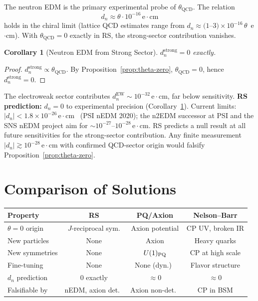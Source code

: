 \documentclass[12pt,a4paper]{article}
\newtheorem{corollary}[theorem]{Corollary}
\theoremstyle{definition}
\theoremstyle{remark}
\begin{document}
The neutron EDM is the primary experimental probe of $\theta_{\mathrm{QCD}}$.
The relation
\begin{equation}
d_n \approx \theta \cdot 10^{-16}\,\mathrm{e}\cdot\mathrm{cm}
\end{equation}
holds in the chiral limit (lattice QCD estimates range from $d_n
\approx (1$--$3) \times 10^{-16}\,\theta$~e$\cdot$cm).
With $\theta_{\mathrm{QCD}} = 0$ exactly in RS, the strong-sector
contribution vanishes.

\begin{corollary}[Neutron EDM from Strong Sector]
\label{cor:nedm}
$d_n^{\mathrm{strong}} = 0$ exactly.
\end{corollary}

\begin{proof}
$d_n^{\mathrm{strong}} \propto \theta_{\mathrm{QCD}}$.  By
Proposition~\ref{prop:theta-zero}, $\theta_{\mathrm{QCD}} = 0$, hence
$d_n^{\mathrm{strong}} = 0$.
\end{proof}

The electroweak sector contributes $d_n^{\mathrm{EW}} \sim
10^{-32}\,\mathrm{e}\cdot\mathrm{cm}$, far below sensitivity.
\textbf{RS prediction:} $d_n = 0$ to experimental precision (Corollary~\ref{cor:nedm}).  Current limits: $|d_n| < 1.8 \times
10^{-26}\,\mathrm{e}\cdot\mathrm{cm}$~\cite{Abel2020} (PSI nEDM
2020); the n2EDM successor at PSI and the SNS nEDM project aim for
$\sim 10^{-27}$--$10^{-28}\,\mathrm{e}\cdot\mathrm{cm}$.  RS
predicts a null result at all future sensitivities for the
strong-sector contribution.  Any finite measurement $|d_n| \gtrsim
10^{-28}\,\mathrm{e}\cdot\mathrm{cm}$ with confirmed QCD-sector
origin would falsify Proposition~\ref{prop:theta-zero}.

\section{Comparison of Solutions}
\label{sec:comparison}

\begin{center}
\renewcommand{\arraystretch}{1.3}
\small
\begin{tabular}{lccc}
\toprule
\textbf{Property} & \textbf{RS} & \textbf{PQ/Axion} & \textbf{Nelson--Barr} \\
\midrule
$\theta=0$ origin & $J$-reciprocal sym. & Axion potential & CP UV, broken IR \\
New particles & None & Axion & Heavy quarks \\
New symmetries & None & $U(1)_{\rm PQ}$ & CP at high scale \\
Fine-tuning & None & None (dyn.)\ & Flavor structure \\
$d_n$ prediction & 0 exactly & $\approx 0$ & $\approx 0$ \\
Falsifiable by & nEDM, axion det.\ & Axion non-det.\ & CP in BSM \\
\bottomrule
\end{tabular}
\end{center}
\end{document}

